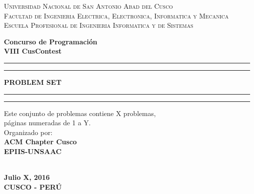 \documentclass[12pt,oneside,a4paper]{book}
\theoremstyle{definition}
\begin{document}
\vspace*{1in}
\begin{center}
\textsc{\large Universidad Nacional de San Antonio Abad del Cusco}\\\vspace*{0.04in}
\textsc{Facultad de Ingenieria Electrica, Electronica, Informatica y Mecanica}\\
\vspace*{0.04in}
\textsc{Escuela Profesional de Ingenieria Informatica y de Sistemas}\\
\captionsetup[figure]{labelformat=empty}

\vspace*{2in}
\newcommand{\topline}{
\rule{164.7mm}{2mm}
\vspace*{-0.18in}
\hrule
}
\newcommand{\downline}{
\hrule
\vspace*{0.02in}
\rule{164.7mm}{2mm}
}
\vspace*{-0.6in}
\textbf{Concurso de Programación}\\
\textbf{VIII CusContest}\\
\vspace*{0.8in} \topline
\vspace*{0.1in}
\begin{large}
\textbf{PROBLEM SET} \\
\end{large}
\vspace*{0.08in}
\downline
\vspace*{0.55in}

\begin{minipage}{\linewidth}
\large
\begin{minipage}{0.45\linewidth}
\end{minipage}
\hspace{0.28\linewidth}
\begin{minipage}{0.8\linewidth}
\begin{normalsize}
Este conjunto de problemas contiene X problemas,\\ páginas numeradas de 1 a Y.\vspace*{0.5in}
\\Organizado por:\vspace*{-0.05in}
\\\textbf{ACM Chapter Cusco}\\
\textbf{EPIIS-UNSAAC}\\
\\
\end{normalsize}
\end{minipage}
\end{minipage}
\vspace*{0.6in}
{
\textbf{Julio X, 2016}\\ \vspace*{-0.6in}
\textbf{CUSCO - PERÚ}
}
\end{center}
\end{document}
